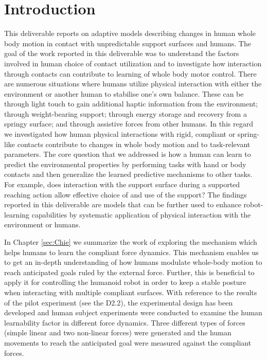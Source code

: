 \documentclass[12pt,a4paper,twoside]{report}
\begin{document}
\chapter{Introduction}\label{sec:Intro}
This deliverable reports on adaptive models describing changes in human whole body motion in contact with unpredictable support surfaces and humans. The goal of the work reported in this deliverable was to understand the factors involved in human choice of contact utilization and to investigate how interaction through contacts can contribute to learning of whole body motor control. There are numerous situations where humans utilize physical interaction with either the environment or another human to stabilise one’s own balance. These can be through light touch to gain additional haptic information from the environment; through weight-bearing support; through energy storage and recovery from a springy surface; and through assistive forces from other humans. In this regard we investigated how human physical interactions with rigid, compliant or spring-like contacts contribute to changes in whole body motion and to task-relevant parameters. The core question that we addressed is how a human can learn to predict the environmental properties by performing tasks with hand or body contacts and then generalize the learned predictive mechanisms to other tasks. For example, does interaction with the support surface during a supported reaching action allow effective choice of and use of the support? The findings reported in this deliverable are models that can be further used to enhance robot-learning capabilities by systematic application of physical interaction with the environment or humans.
\bigskip

In Chapter \ref{sec:Chie} we summarize the work of exploring the mechanism which helps humans to learn the compliant force dynamics. This mechanism enables us to get an in-depth understanding of how humans modulate whole-body motion to reach anticipated goals ruled by the external force. Further, this is beneficial to apply it for controlling the humanoid robot in order to keep a stable posture when interacting with multiple compliant surfaces. With reference to the results of the pilot experiment (see the D2.2), the experimental design has been developed and human subject experiments were conducted to examine the human learnability factor in different force dynamics. Three different types of forces (simple linear and two non-linear forces) were generated and the human movements to reach the anticipated goal were measured against the compliant forces.
\bigskip
\end{document}
